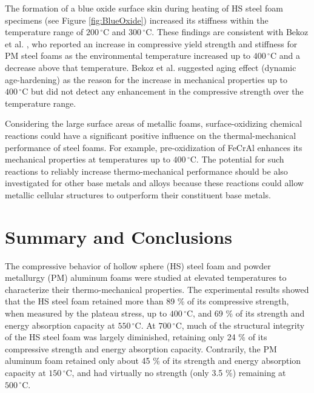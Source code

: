\documentclass[review]{elsarticle}
\begin{document}
{The formation of a blue oxide surface skin during heating of HS steel foam specimens (see Figure \ref{fig:BlueOxide}) increased its stiffness within the temperature range of $200\,^{\circ}\mathrm{C}$ and $300\,^{\circ}\mathrm{C}$. These findings are consistent with Bekoz et al. \cite{BekozOktay2014}, who reported an increase in compressive yield strength and stiffness for PM steel foams as the environmental temperature increased up to $400\,^{\circ}\mathrm{C}$ and a decrease above that temperature. Bekoz et al. \cite{BekozOktay2014} suggested aging effect (dynamic age-hardening) as the reason for the increase in mechanical properties up to $400\,^{\circ}\mathrm{C}$ but did not detect any enhancement in the compressive strength over the temperature range.

Considering the large surface areas of metallic foams, surface-oxidizing chemical reactions could have a significant positive influence on the thermal-mechanical performance of steel foams. For example, pre-oxidization of FeCrAl enhances its mechanical properties at temperatures up to $400\,^{\circ}\mathrm{C}$. The potential for such reactions to reliably increase thermo-mechanical performance should be also investigated for other base metals and alloys because these reactions could allow metallic cellular structures to outperform their constituent base metals.

\section{Summary and Conclusions}

The compressive behavior of hollow sphere (HS) steel foam and powder metallurgy (PM) aluminum foams were studied at elevated temperatures to characterize their thermo-mechanical properties. The experimental results showed that the HS steel foam retained more than 89 \% of its compressive strength, when measured by the plateau stress, up to $400\,^{\circ}\mathrm{C}$, and 69 \% of its strength and energy absorption capacity at $550\,^{\circ}\mathrm{C}$. At $700\,^{\circ}\mathrm{C}$, much of the structural integrity of the HS steel foam was largely diminished, retaining only 24 \% of its compressive strength and energy absorption capacity. Contrarily, the PM aluminum foam retained only about 45 \% of its strength and energy absorption capacity at $150\,^{\circ}\mathrm{C}$, and had virtually no strength (only 3.5 \%) remaining at $500\,^{\circ}\mathrm{C}$.

}
\end{document}
